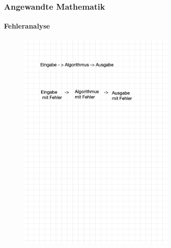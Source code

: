\documentclass{beamer}
\begin{document}
 \begin{frame}
    \frametitle{Angewandte Mathematik}
\framesubtitle{Fehleranalyse}
\begin{figure}[H]
      \centering
    \includegraphics[width=0.7\textwidth]{images/fehler}\end{figure}
 \end{frame}
\end{document}
